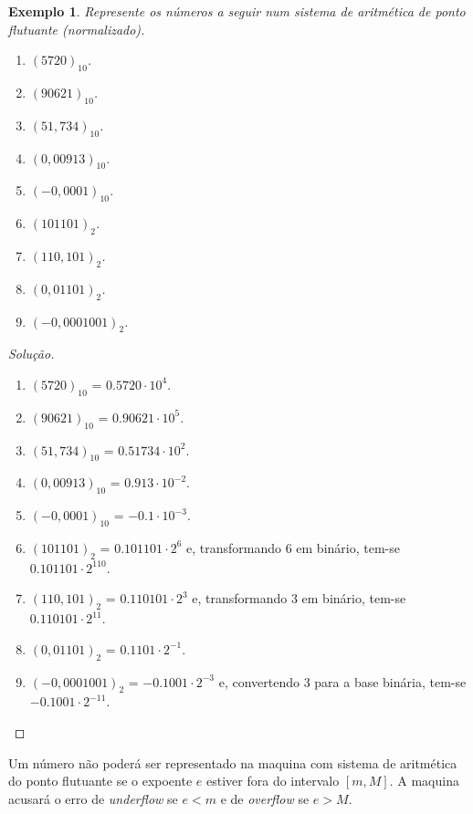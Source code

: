 \documentclass[
	12pt,				%
	openright,			%
	twoside,			%
	a4paper,			%
	english,			%
	french,				%
	brazil,				%
	sumario=tradicional
]{abntex2}
\newtheorem{example}{Exemplo}
\newenvironment{solution}{
	\begin{proof}[Solução]
}{\end{proof}}
\numberwithin{example}{chapter}
\numberwithin{remark}{chapter}
\numberwithin{definition}{chapter}
\numberwithin{figure}{chapter}
\begin{document}
\begin{example}
    Represente os números a seguir num sistema de aritmética de ponto flutuante (normalizado).
    \begin{enumerate}
    	\item $(5720)_{10}$.
	    \item $(90621)_{10}$.
    	\item $(51,734)_{10}$.
	    \item $(0,00913)_{10}$.
    	\item $(-0,0001)_{10}$.
	    \item $(101101)_{2}$.
    	\item $(110,101)_{2}$.
	    \item $(0,01101)_{2}$.
    	\item $(-0,0001001)_{2}$.
	\end{enumerate}
\end{example}
\begin{solution}\hfill
	\begin{enumerate}
    	\item $(5720)_{10}$ = $0.5720\cdot 10^4$.
	    \item $(90621)_{10}$ = $0.90621\cdot 10^5$.
    	\item $(51,734)_{10}$ = $0.51734\cdot 10^2$.
	    \item $(0,00913)_{10}$ = $0.913\cdot 10^{-2}$.
    	\item $(-0,0001)_{10}$ = $-0.1\cdot 10^{-3}$.
	    \item $(101101)_{2}$ = $0.101101\cdot 2^{6}$ e, transformando 6 em binário, tem-se $0.101101\cdot 2^{110}$.
    	\item $(110,101)_{2}$ = $0.110101\cdot 2^3$ e, transformando 3 em binário, tem-se $0.110101\cdot 2^{11}$.
	    \item $(0,01101)_{2}$ = $0.1101\cdot 2^{-1}$.
    	\item $(-0,0001001)_{2}$ = $-0.1001\cdot 2^{-3}$ e, convertendo 3 para a base binária, tem-se $-0.1001\cdot 2^{-11}$.
	\end{enumerate}
\end{solution}

Um número não poderá ser representado na maquina com sistema de aritmética do ponto flutuante se o expoente $e$ estiver fora do intervalo $[m, M]$. A maquina acusará o erro de \textit{underflow} se $e < m$ e de \textit{overflow} se $e>M$.
\end{document}
